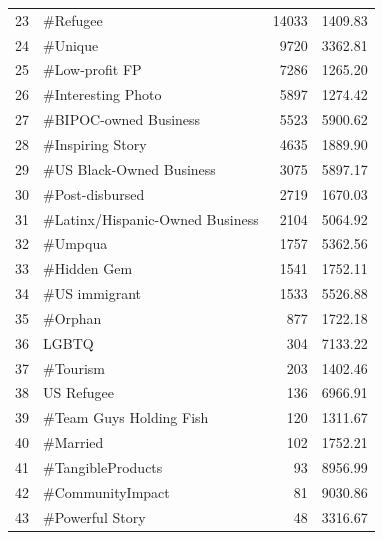 \begin{longtable}{|c|l|r|r|}
   23 &                        \#Refugee &          14033 &              1409.83 \\
   24 &                         \#Unique &           9720 &              3362.81 \\
   25 &                  \#Low-profit FP &           7286 &              1265.20 \\
   26 &              \#Interesting Photo &           5897 &              1274.42 \\
   27 &           \#BIPOC-owned Business &           5523 &              5900.62 \\
   28 &                \#Inspiring Story &           4635 &              1889.90 \\
   29 &        \#US Black-Owned Business &           3075 &              5897.17 \\
   30 &                 \#Post-disbursed &           2719 &              1670.03 \\
   31 & \#Latinx/Hispanic-Owned Business &           2104 &              5064.92 \\
   32 &                         \#Umpqua &           1757 &              5362.56 \\
   33 &                     \#Hidden Gem &           1541 &              1752.11 \\
   34 &                   \#US immigrant &           1533 &              5526.88 \\
   35 &                         \#Orphan &            877 &              1722.18 \\
   36 &                           LGBTQ &            304 &              7133.22 \\
   37 &                        \#Tourism &            203 &              1402.46 \\
   38 &                      US Refugee &            136 &              6966.91 \\
   39 &         \#Team Guys Holding Fish &            120 &              1311.67 \\
   40 &                        \#Married &            102 &              1752.21 \\
   41 &               \#TangibleProducts &             93 &              8956.99 \\
   42 &                \#CommunityImpact &             81 &              9030.86 \\
   43 &                 \#Powerful Story &             48 &              3316.67 \\

\end{longtable}
